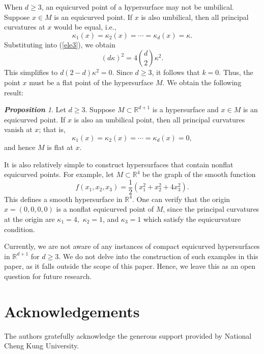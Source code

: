 \documentclass{amsart}
\theoremstyle{Theorem}
\theoremstyle{remark}
\newtheorem{prop}{\bf Proposition}[section]
\numberwithin{equation}{section} \numberwithin{figure}{section}
\begin{document}
When \( d \geq 3 \), an equicurved point of a hypersurface may not be umbilical. Suppose \( x \in M \) is an equicurved point. If \( x \) is also umbilical, then all principal curvatures at \( x \) would be equal, i.e.,
\[
\kappa_1(x) = \kappa_2(x) = \cdots = \kappa_d(x) = \kappa.
\]
Substituting into (\ref{ele3}), we obtain
\[
(d\kappa)^2 = 4 \binom{d}{2} \kappa^2.
\]
This simplifies to
\(
d(2 - d)\kappa^2 = 0.
\)
Since \( d \geq 3 \), it follows that \( k = 0 \). Thus, the point \( x \) must be a flat point of the hypersurface \( M \). We obtain the following result:
\begin{prop}
Let \( d \geq 3 \). Suppose \( M \subset \mathbb{R}^{d+1} \) is a hypersurface and \( x \in M \) is an equicurved point. If \( x \) is also an umbilical point, then all principal curvatures vanish at \( x \); that is,
\[
\kappa_1(x) = \kappa_2(x) = \cdots = \kappa_d(x) = 0,
\]
and hence \( M \) is flat at \( x \).
\end{prop}


It is also relatively simple to construct hypersurfaces that contain nonflat equicurved points. For example, let \( M \subset \mathbb{R}^4 \) be the graph of the smooth function
\[
f(x_1, x_2, x_3) = \frac{1}{2}(x_1^2 + x_2^2 + 4x_3^2).
\]
This defines a smooth hypersurface in \( \mathbb{R}^4 \). One can verify that the origin \( x = (0, 0, 0, 0) \) is a nonflat equicurved point of \( M \), since the principal curvatures at the origin are
\(\kappa_1 = 4,\) \( \kappa_2 = 1\), and \( \kappa_3 = 1\) which satisfy the equicurvature condition.

Currently, we are not aware of any instances of compact equicurved hypersurfaces in \( \mathbb{R}^{d+1} \) for \( d \geq 3 \). We do not delve into the construction of such examples in this paper, as it falls outside the scope of this paper. Hence, we leave this as an open question for future research.


\section*{Acknowledgements}
The authors gratefully acknowledge the generous support provided by National Cheng Kung University.
\end{document}
